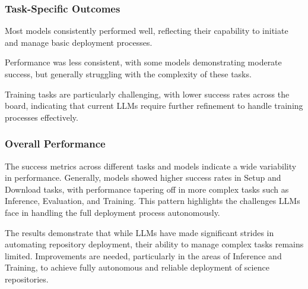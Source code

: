 




\subsubsection{Task-Specific Outcomes}
 Most models consistently performed well, reflecting their capability to initiate and manage basic deployment processes.



 Performance was less consistent, with some models demonstrating moderate success, but generally struggling with the complexity of these tasks.

 Training tasks are particularly challenging, with lower success rates across the board, indicating that current LLMs require further refinement to handle training processes effectively.


\subsubsection{Overall Performance}





The success metrics across different tasks and models indicate a wide variability in performance. Generally, models showed higher success rates in Setup and Download tasks, with performance tapering off in more complex tasks such as Inference, Evaluation, and Training. This pattern highlights the challenges LLMs face in handling the full deployment process autonomously.

The results demonstrate that while LLMs have made significant strides in automating repository deployment, their ability to manage complex tasks remains limited. Improvements are needed, particularly in the areas of Inference and Training, to achieve fully autonomous and reliable deployment of science repositories.

